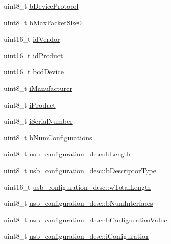 \begin{DoxyCompactItemize}
\item 
uint8\-\_\-t \hyperlink{group___p_i_o_s___u_s_b___d_e_f_s_ga44e204b5f7158f4048edcb944351ce27}{b\-Device\-Protocol}
\item 
uint8\-\_\-t \hyperlink{group___p_i_o_s___u_s_b___d_e_f_s_ga93b2c926b005917cdf2b5e7e4b3f80a2}{b\-Max\-Packet\-Size0}
\item 
uint16\-\_\-t \hyperlink{group___p_i_o_s___u_s_b___d_e_f_s_gab393e07556e3858fed36ed2e260d4b4c}{id\-Vendor}
\item 
uint16\-\_\-t \hyperlink{group___p_i_o_s___u_s_b___d_e_f_s_ga2cf29745398a958349d784b1911c6b2b}{id\-Product}
\item 
uint16\-\_\-t \hyperlink{group___p_i_o_s___u_s_b___d_e_f_s_ga4ac87bf0a9ee1a9e0eec6d50a8b0e3f9}{bcd\-Device}
\item 
uint8\-\_\-t \hyperlink{group___p_i_o_s___u_s_b___d_e_f_s_ga7ee6ae41b483f3c49d1ddb39a83a8a43}{i\-Manufacturer}
\item 
uint8\-\_\-t \hyperlink{group___p_i_o_s___u_s_b___d_e_f_s_ga77c33850b90ff7617243c40ce61d9168}{i\-Product}
\item 
uint8\-\_\-t \hyperlink{group___p_i_o_s___u_s_b___d_e_f_s_gaeb129fc0d41494f69369da70d73eac11}{i\-Serial\-Number}
\item 
uint8\-\_\-t \hyperlink{group___p_i_o_s___u_s_b___d_e_f_s_gabde4f60e84b2d9b10c27aa23bae62595}{b\-Num\-Configurations}
\item 
uint8\-\_\-t \hyperlink{group___p_i_o_s___u_s_b___d_e_f_s_ga37130504779d534ee26038329c6cf556}{usb\-\_\-configuration\-\_\-desc\-::b\-Length}
\item 
uint8\-\_\-t \hyperlink{group___p_i_o_s___u_s_b___d_e_f_s_gaa3581ef511398a39f3dba3517e45207b}{usb\-\_\-configuration\-\_\-desc\-::b\-Descriptor\-Type}
\item 
uint16\-\_\-t \hyperlink{group___p_i_o_s___u_s_b___d_e_f_s_ga5d8ee63135423fa6ee5de728aa2c4ffd}{usb\-\_\-configuration\-\_\-desc\-::w\-Total\-Length}
\item 
uint8\-\_\-t \hyperlink{group___p_i_o_s___u_s_b___d_e_f_s_ga12405f84f025bf39bd4261c0ec16b709}{usb\-\_\-configuration\-\_\-desc\-::b\-Num\-Interfaces}
\item 
uint8\-\_\-t \hyperlink{group___p_i_o_s___u_s_b___d_e_f_s_ga3a0621b62628b16a9f6bb18aace6a2bb}{usb\-\_\-configuration\-\_\-desc\-::b\-Configuration\-Value}
\item 
uint8\-\_\-t \hyperlink{group___p_i_o_s___u_s_b___d_e_f_s_ga2cc988492163e6ca3d548cf632fbf01d}{usb\-\_\-configuration\-\_\-desc\-::i\-Configuration}

\end{DoxyCompactItemize}
